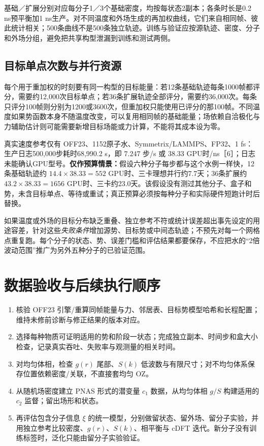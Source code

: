 \documentclass[11pt,a4paper]{article}
\begin{document}
基础／扩展分别对应每分子1／3个基础密度，均按每状态2副本；各条时长是0.2 ns预平衡加1 ns生产。对不同温度和外场生成的再加权曲线，它们来自相同帧、彼此统计相关；500条曲线不是500条独立轨迹。训练与验证应按源轨迹、密度、分子和外场分组，避免把共享构型泄漏到训练和测试两侧。

\subsection{目标单点次数与并行资源}
每个用于重加权的时刻要有同一构型的目标能量：若12条基础轨迹每条1000帧都评分，需要约12,000次目标单点；若36条扩展轨迹全部评分，需要约36,000次。每条只评分100帧则分别为1200或3600次，但重加权只能使用已评分的那100帧。不同温度如果势函数本身不随温度改变，可以复用相同帧的基础能量；场依赖自洽极化与力辅助估计则可能需要新增目标场能或力计算，不能将其成本设为零。

真实速度参考仅有 OFF23、1152原子水、Symmetrix/LAMMPS、FP32、1 fs：生产日志500,000步耗时68,990.2 s，即 $7.247$ 步/s 或 $38.33$ GPU时/ns［6］；日志未能确认GPU型号。\textbf{仅作预算情景：}假设六种分子每步都与这个水例一样快，12条基础轨迹约 $14.4\times38.33=552$ GPU时、三卡理想并行约7.7天；36条扩展约 $43.2\times38.33=1656$ GPU时、三卡约23.0天。该假设没有测过其他分子、盒子和势，未含目标单点、等待或重试；真正预算必须按每种分子和实际硬件短跑计时后替换。

如果温度或外场的目标分布缺乏重叠、独立参考不符或统计误差超出事先设定的用途容差，针对这些\emph{失败条件}增加源势、目标势或中间态轨迹；不预先对每一个网格点重复跑。每个分子的状态、势、误差门槛和评估结果都要保存，不应把水的“2倍波动范围”推广为另外五种分子的已验证范围。

\section{数据验收与后续执行顺序}
\begin{enumerate}
\item 核验 OFF23 引擎/重算同帧能量与力、邻居表、目标势模型哈希和长程配置；维持未修前诊断与修正结果的版本对应。
\item 选择每种物质可证明适用的势和阶段一状态；完成独立副本、时间步和盒大小检查，记录真实吞吐、失败率与观测量的相关时间。
\item 对均匀体相，检查 $g(r)$ 尾部、$S(k)$ 低波数与有限尺寸；对不均匀体系保存位置依赖密度/关联，不直接套均匀 OZ。
\item 从随机场密度建立 PNAS 形式的潜变量 $c_1$ 数据，从均匀体相 $g/S$ 构建适用的 $c_2$ 监督；留出场形和状态。
\item 再评估包含分子信息 $\xi$ 的统一模型，分别做留状态、留外场、留分子实验，并用独立参考比较密度、$g(r)$、$S(k)$、相平衡与 cDFT 迭代。新分子没有训练标签时，泛化只能由留分子实验验证。
\end{enumerate}
\end{document}
